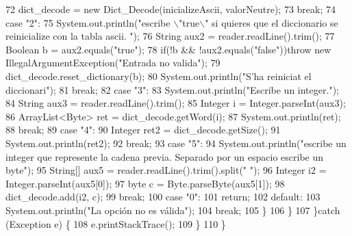 \begin{DoxyCode}
72                     dict\_decode = \textcolor{keyword}{new} Dict\_Decode(inicializeAscii, valorNeutre);
73                 \textcolor{keywordflow}{break};
74                 \textcolor{keywordflow}{case} \textcolor{stringliteral}{"2"}:
75                     System.out.println(\textcolor{stringliteral}{"escribe \(\backslash\)"true\(\backslash\)" si quieres que el diccionario se reinicialize con
       la tabla ascii. "});
76                     String aux2 = reader.readLine().trim();
77                     Boolean b = aux2.equals(\textcolor{stringliteral}{"true"});
78                     \textcolor{keywordflow}{if}(!b && !aux2.equals(\textcolor{stringliteral}{"false"}))\textcolor{keywordflow}{throw} \textcolor{keyword}{new} IllegalArgumentException(\textcolor{stringliteral}{"Entrada no valida"});
79                     dict\_decode.reset\_dictionary(b);
80                     System.out.println(\textcolor{stringliteral}{"S'ha reiniciat el diccionari"});
81                 \textcolor{keywordflow}{break};
82                 \textcolor{keywordflow}{case} \textcolor{stringliteral}{"3"}:
83                     System.out.println(\textcolor{stringliteral}{"Escribe un integer."});
84                     String aux3 = reader.readLine().trim();
85                     Integer i = Integer.parseInt(aux3);
86                     ArrayList<Byte> ret = dict\_decode.getWord(i);
87                     System.out.println(ret);
88                 \textcolor{keywordflow}{break};
89                 \textcolor{keywordflow}{case} \textcolor{stringliteral}{"4"}:
90                     Integer ret2 = dict\_decode.getSize();
91                     System.out.println(ret2);
92                 \textcolor{keywordflow}{break};
93                 \textcolor{keywordflow}{case} \textcolor{stringliteral}{"5"}:
94                     System.out.println(\textcolor{stringliteral}{"escribe un integer que represente la cadena previa. Separado por un
       espacio escribe un byte"});
95                     String[] aux5 = reader.readLine().trim().split(\textcolor{stringliteral}{" "});
96                     Integer i2 = Integer.parseInt(aux5[0]);
97                     byte c = Byte.parseByte(aux5[1]);
98                     dict\_decode.add(i2, c);
99                 \textcolor{keywordflow}{break};
100                 \textcolor{keywordflow}{case} \textcolor{stringliteral}{"0"}:
101                     \textcolor{keywordflow}{return};
102                 \textcolor{keywordflow}{default}:
103                     System.out.println(\textcolor{stringliteral}{"La opción no es válida"});
104                 \textcolor{keywordflow}{break};
105             \}
106         \}
107     \}\textcolor{keywordflow}{catch} (Exception e) \{
108         e.printStackTrace();
109     \}
110     \}
\end{DoxyCode}
\mbox{\label{classdomini_1_1utils_1_1Driver____Dict__Decode_af3ae63bfc55ea99e468d6c9c86ec26c9}} 
